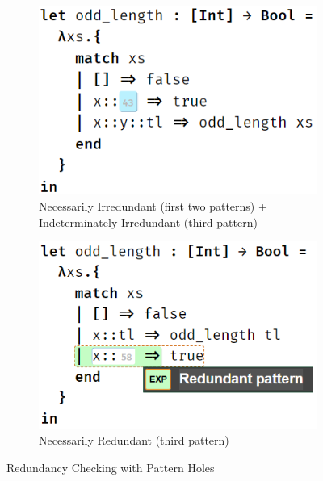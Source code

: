 \begin{figure}
    \begin{subfigure}[t]{0.45\textwidth}
    \centering
    \includegraphics[scale=0.5,valign=t]{imgs/maybe_redundant.png}%
    \vspace{-6px}
    \caption{Necessarily Irredundant (first two patterns) + Indeterminately Irredundant (third pattern)\label{fig:may-redundant}}
    \end{subfigure}
    \begin{subfigure}[t]{0.45\textwidth}
    \centering
  \includegraphics[scale=0.5,valign=t]{imgs/redundant.png}
  \vspace{-6px}
  \caption{Necessarily Redundant (third pattern) \label{fig:must-redundant}}
  \end{subfigure}
  \vspace{-3px}
  \caption{Redundancy Checking with Pattern Holes}
  \vspace{-3px}
  \label{fig:redundancy}
\end{figure}


